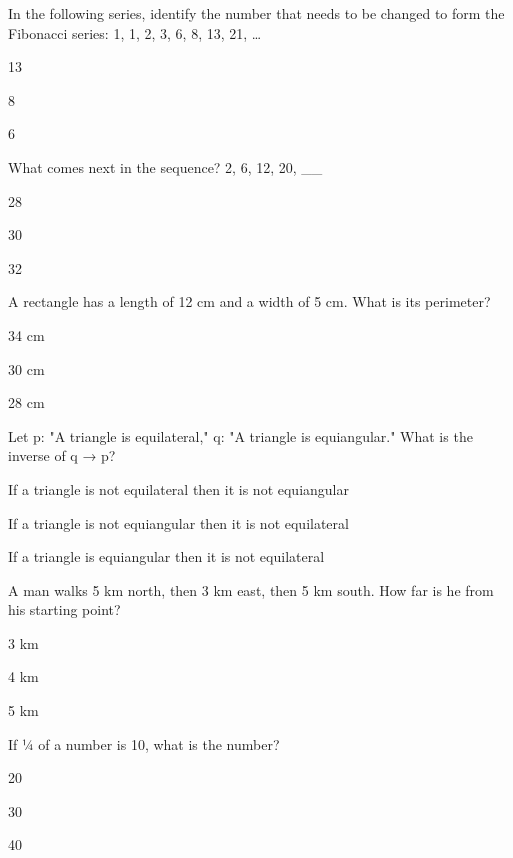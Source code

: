 
\begin{enhancedmcq}{In the following series, identify the number that needs to be changed to form the Fibonacci series:}
   1, 1, 2, 3, 6, 8, 13, 21, …  
\item 13
\item 8
\item 6

\end{enhancedmcq}
\begin{enhancedmcq}{What comes next in the sequence?}
   2, 6, 12, 20, __  
\item 28
\item 30
\item 32

\end{enhancedmcq}
\begin{enhancedmcq}{A rectangle has a length of 12 cm and a width of 5 cm. What is its perimeter?}
\item 34 cm
\item 30 cm
\item 28 cm

\end{enhancedmcq}
\begin{enhancedmcq}{Let p: "A triangle is equilateral," q: "A triangle is equiangular." What is the inverse of q → p?}
\item If a triangle is not equilateral then it is not equiangular
\item If a triangle is not equiangular then it is not equilateral
\item If a triangle is equiangular then it is not equilateral

\end{enhancedmcq}
\begin{enhancedmcq}{A man walks 5 km north, then 3 km east, then 5 km south. How far is he from his starting point?}
\item 3 km
\item 4 km
\item 5 km

\end{enhancedmcq}
\begin{enhancedmcq}{If ¼ of a number is 10, what is the number?}
\item 20
\item 30
\item 40

\end{enhancedmcq}
